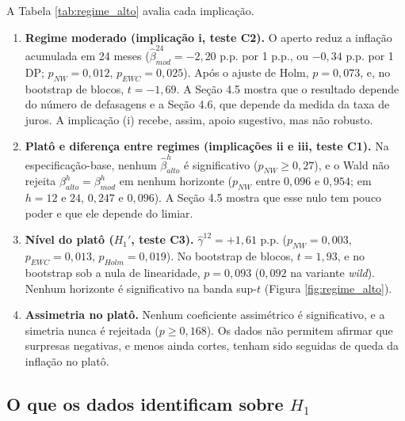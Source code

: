 \documentclass[12pt,a4paper]{article}
\begin{document}
A Tabela \ref{tab:regime_alto} avalia cada implicação.
\begin{enumerate}
    \item \textbf{Regime moderado (implicação i, teste C2).} O aperto reduz a inflação acumulada em 24 meses ($\hat{\beta}_{mod}^{24} = -2{,}20$ p.p. por 1 p.p., ou $-0{,}34$ p.p. por 1 DP; $p_{NW} = 0{,}012$, $p_{EWC} = 0{,}025$). Após o ajuste de Holm, $p = 0{,}073$, e, no bootstrap de blocos, $t = -1{,}69$. A Seção 4.5 mostra que o resultado depende do número de defasagens e a Seção 4.6, que depende da medida da taxa de juros. A implicação (i) recebe, assim, apoio sugestivo, mas não robusto.
    \item \textbf{Platô e diferença entre regimes (implicações ii e iii, teste C1).} Na especificação-base, nenhum $\hat{\beta}_{alto}^h$ é significativo ($p_{NW} \ge 0{,}27$), e o Wald não rejeita $\beta_{alto}^h = \beta_{mod}^h$ em nenhum horizonte ($p_{NW}$ entre $0{,}096$ e $0{,}954$; em $h = 12$ e $24$, $0{,}247$ e $0{,}096$). A Seção 4.5 mostra que esse nulo tem pouco poder e que ele depende do limiar.
    \item \textbf{Nível do platô ($H_1'$, teste C3).} $\hat{\gamma}^{12} = +1{,}61$ p.p. ($p_{NW} = 0{,}003$, $p_{EWC} = 0{,}013$, $p_{Holm} = 0{,}019$). No bootstrap de blocos, $t = 1{,}93$, e no bootstrap sob a nula de linearidade, $p = 0{,}093$ ($0{,}092$ na variante \textit{wild}). Nenhum horizonte é significativo na banda sup-$t$ (Figura \ref{fig:regime_alto}).
    \item \textbf{Assimetria no platô.} Nenhum coeficiente assimétrico é significativo, e a simetria nunca é rejeitada ($p \ge 0{,}168$). Os dados não permitem afirmar que surpresas negativas, e menos ainda cortes, tenham sido seguidas de queda da inflação no platô.
\end{enumerate}

\subsection{O que os dados identificam sobre $H_1$}
\end{document}

